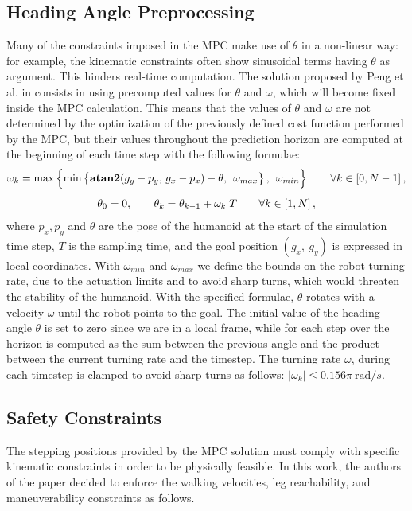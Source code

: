 \subsection{Heading Angle Preprocessing}
Many of the constraints imposed in the MPC make use of $\theta$ in a non-linear way: for example, the kinematic constraints often show sinusoidal terms having $\theta$ as argument. This hinders real-time computation. The solution proposed by Peng et al. in \cite{peng_main_paper} consists in using precomputed values for $\theta$ and $\omega$, which will become fixed inside the MPC calculation.
This means that the values of $\theta$ and $\omega$ are not determined by the optimization of the previously defined cost function performed by the MPC, but their values throughout the prediction horizon are computed at the beginning of each time step with the following formulae:
\begin{gather}
\omega_k = \max \left\{ \min \left\{ \operatorname{\textbf{atan2}}(g_y - p_y,\, g_x - p_x) - \theta,\, \; \omega_{max} \right\} ,\, \; \omega_{min} \right\} \qquad \forall k \in \left[0, N-1 \right], \notag \\[1ex]
\theta_0 = 0, \qquad \theta_k = \theta_{k-1} + \omega_k\;T \qquad \forall k \in \left[1, N\right], \notag
\end{gather}
where $p_x, p_y$ and $\theta$ are the pose of the humanoid at the start of the simulation time step, $T$ is the sampling time, and the goal position $(g_x, \ g_y)$ is expressed in local coordinates. With $\omega_{min}$ and $\omega_{max}$ we define the bounds on the robot turning rate, due to the actuation limits and to avoid sharp turns, which would threaten the stability of the humanoid. With the specified formulae, $\theta$ rotates with a velocity $\omega$ until the robot points to the goal. The initial value of the heading angle $\theta$ is set to zero since we are in a local frame, while for each step over the horizon is computed as the sum between the previous angle and the product between the current turning rate and the timestep. The turning rate $\omega$, during each timestep is clamped to avoid sharp turns as follows: $ |\omega_k| \le 0.156 \pi \ \text{rad}/s$.

\subsection{Safety Constraints}
The stepping positions provided by the MPC solution must comply with specific kinematic constraints in order to be physically feasible. In this work, the authors of the paper decided to enforce the walking velocities, leg reachability, and maneuverability constraints as follows.

